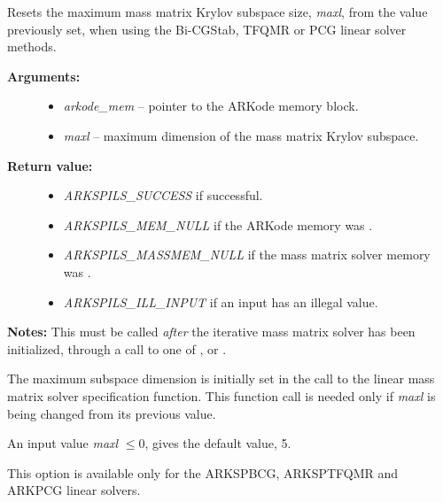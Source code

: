 \documentclass[letterpaper,10pt,english]{sphinxmanual}
\begin{document}

\begin{fulllineitems}
\label{c_interface/User_callable:ARKSpilsSetMassMaxl}
Resets the maximum mass matrix Krylov subspace size, \emph{maxl}, from
the value previously set, when using the Bi-CGStab, TFQMR or PCG linear
solver methods.
\begin{description}
\item[{\textbf{Arguments:}}] \leavevmode\begin{itemize}
\item {} 
\emph{arkode\_mem} -- pointer to the ARKode memory block.

\item {} 
\emph{maxl} -- maximum dimension of the mass matrix Krylov subspace.

\end{itemize}

\item[{\textbf{Return value:}}] \leavevmode\begin{itemize}
\item {} 
\emph{ARKSPILS\_SUCCESS} if successful.

\item {} 
\emph{ARKSPILS\_MEM\_NULL} if the ARKode memory was .

\item {} 
\emph{ARKSPILS\_MASSMEM\_NULL} if the mass matrix solver memory was .

\item {} 
\emph{ARKSPILS\_ILL\_INPUT} if an input has an illegal value.

\end{itemize}

\end{description}

\textbf{Notes:} This must be called \emph{after} the iterative mass matrix
solver has been initialized, through a call to one of
{\hyperref[c_interface/User_callable:ARKMassSpbcg]{}}, {\hyperref[c_interface/User_callable:ARKMassSptfqmr]{}} or
{\hyperref[c_interface/User_callable:ARKMassPcg]{}}.

The maximum subspace dimension is initially set in the
call to the linear mass matrix solver specification function.  This
function call is needed only if \emph{maxl} is being changed from its
previous value.

An input value \emph{maxl} $\le 0$, gives the default value, 5.

This option is available only for the ARKSPBCG, ARKSPTFQMR and
ARKPCG linear solvers.

\end{fulllineitems}
\end{document}
